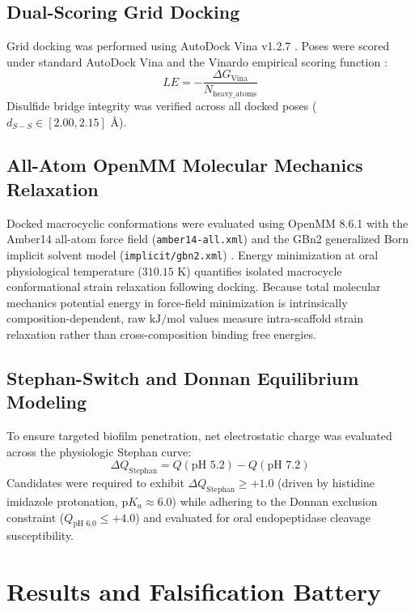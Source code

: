 \documentclass[11pt,a4paper]{article}
\begin{document}
\subsection{Dual-Scoring Grid Docking}
Grid docking was performed using AutoDock Vina v1.2.7 \cite{Trott2010, Eberhardt2021}. Poses were scored under standard AutoDock Vina and the Vinardo empirical scoring function \cite{Quiroga2016}:
\begin{equation}
LE = -\frac{\Delta G_{\text{Vina}}}{N_{\text{heavy\_atoms}}}
\end{equation}
Disulfide bridge integrity was verified across all docked poses ($d_{S-S} \in [2.00, 2.15]\text{ \AA}$).

\subsection{All-Atom OpenMM Molecular Mechanics Relaxation}
Docked macrocyclic conformations were evaluated using OpenMM 8.6.1 \cite{Eastman2017} with the Amber14 all-atom force field (\texttt{amber14-all.xml}) and the GBn2 generalized Born implicit solvent model (\texttt{implicit/gbn2.xml}) \cite{Maier2015, Nguyen2013}. Energy minimization at oral physiological temperature ($310.15\text{ K}$) quantifies isolated macrocycle conformational strain relaxation following docking. Because total molecular mechanics potential energy in force-field minimization is intrinsically composition-dependent, raw $\text{kJ/mol}$ values measure intra-scaffold strain relaxation rather than cross-composition binding free energies.

\subsection{Stephan-Switch and Donnan Equilibrium Modeling}
To ensure targeted biofilm penetration, net electrostatic charge was evaluated across the physiologic Stephan curve:
\begin{equation}
\Delta Q_{\text{Stephan}} = Q(\text{pH } 5.2) - Q(\text{pH } 7.2)
\end{equation}
Candidates were required to exhibit $\Delta Q_{\text{Stephan}} \ge +1.0$ (driven by histidine imidazole protonation, $\text{p}K_a \approx 6.0$) while adhering to the Donnan exclusion constraint ($Q_{\text{pH } 6.0} \le +4.0$) and evaluated for oral endopeptidase cleavage susceptibility.

\section{Results and Falsification Battery}
\end{document}
